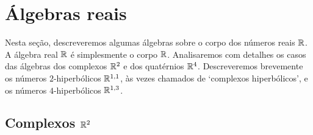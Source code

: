 \begin{comment}

\end{comment}




























\section{Álgebras reais}

Nesta seção, descreveremos algumas álgebras sobre o corpo dos números reais $\mathbb{R}$. A álgebra real $\mathbb{R}$ é simplesmente o corpo $\mathbb{R}$. Analisaremos com detalhes os casos das álgebras dos complexos $\mathbb{R}^2$ e dos quatérnios $\mathbb{R}^4$. Descreveremos brevemente os números $2$-hiperbólicos $\mathbb{R}^{1,1}$, às vezes chamados de `complexos hiperbólicos', e os números $4$-hiperbólicos $\mathbb{R}^{1,3}$.

\subsection{Complexos \ensuremath{\R^2}}

